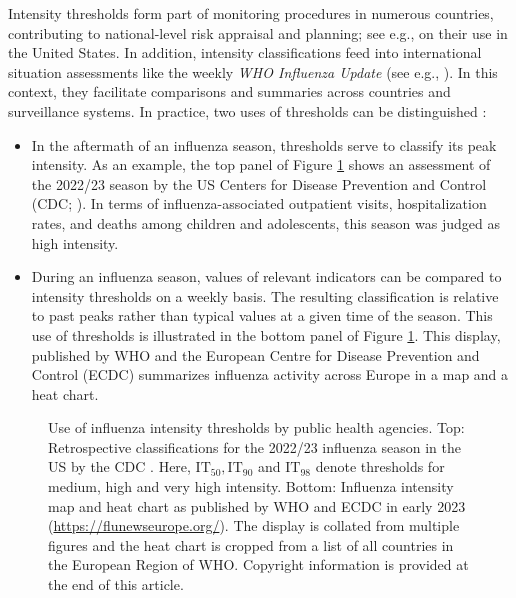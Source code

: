 \documentclass[12pt]{article}
\begin{document}
Intensity thresholds form part of monitoring procedures in numerous countries, contributing to national-level risk appraisal and planning; see e.g., \cite{CDC2024} on their use in the United States. In addition, intensity classifications feed into international situation assessments like the weekly \textit{WHO Influenza Update} (see e.g., \citealt{WHO2024}). In this context, they facilitate comparisons and summaries across countries and surveillance systems. In practice, two uses of thresholds can be distinguished \citep{CDC2024}:
\begin{itemize}
\item[(1)] In the aftermath of an influenza season, thresholds serve to classify its peak intensity. As an example, the top panel of Figure \ref{fig:maps} shows an assessment of the 2022/23 season by the US Centers for Disease Prevention and Control (CDC; \citealt{White2023}). In terms of influenza-associated outpatient visits, hospitalization rates, and deaths among children and adolescents, this season was judged as high intensity.
\item[(2)] During an influenza season, values of relevant indicators can be compared to intensity thresholds on a weekly basis. The resulting classification is relative to past peaks rather than typical values at a given time of the season. This use of thresholds is illustrated in the bottom panel of Figure \ref{fig:maps}. This display, published by WHO and the European Centre for Disease Prevention and Control (ECDC) summarizes influenza activity across Europe in a map and a heat chart.
\end{itemize}

\begin{figure}[h!]
\begin{center}

\medskip

\end{center}
\caption{Use of influenza intensity thresholds by public health agencies. Top: Retrospective classifications for the 2022/23 influenza season in the US by the CDC \citep{White2023}. Here, $\text{IT}_{50}, \text{IT}_{90}$ and $\text{IT}_{98}$ denote thresholds for medium, high and very high intensity. Bottom: Influenza intensity map and heat chart as published by WHO and ECDC in early 2023 (\url{https://flunewseurope.org/}). The display is collated from multiple figures and the heat chart is cropped from a list of all countries in the European Region of WHO. Copyright information is provided at the end of this article.
}
\label{fig:maps}
\end{figure}
\end{document}
